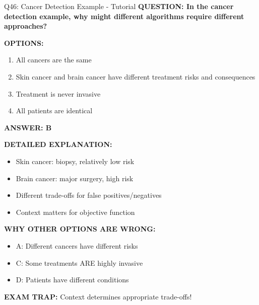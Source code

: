 \documentclass[8pt]{beamer}
\begin{document}
	\begin{frame}{Q46: Cancer Detection Example - Tutorial}
		\fontsize{6.5}{7.5}\selectfont
		\textbf{QUESTION: In the cancer detection example, why might different algorithms require different approaches?}
		
		\vspace{0.1cm}
		\textbf{OPTIONS:}
		\begin{enumerate}
			\item All cancers are the same
			\item Skin cancer and brain cancer have different treatment risks and consequences
			\item Treatment is never invasive
			\item All patients are identical
		\end{enumerate}
		
		\vspace{0.1cm}
		\textcolor{myblue}{\textbf{ANSWER: B}}
		
		\vspace{0.1cm}
		\textbf{DETAILED EXPLANATION:}
		\begin{itemize}
			\item Skin cancer: biopsy, relatively low risk
			\item Brain cancer: major surgery, high risk
			\item Different trade-offs for false positives/negatives
			\item Context matters for objective function
		\end{itemize}
		
		\vspace{0.1cm}
		\textcolor{myred}{\textbf{WHY OTHER OPTIONS ARE WRONG:}}
		\begin{itemize}
			\item \textcolor{myred}{A:} Different cancers have different risks
			\item \textcolor{myred}{C:} Some treatments ARE highly invasive
			\item \textcolor{myred}{D:} Patients have different conditions
		\end{itemize}
		
		\textcolor{myred}{\textbf{EXAM TRAP:}} Context determines \textcolor{myblue}{appropriate trade-offs}!
	\end{frame}
	
\end{document}
